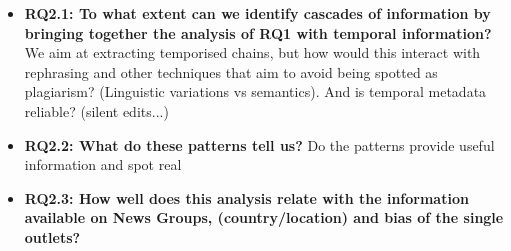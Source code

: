 \vspace{12px}

\begin{itemize}
    \item \textbf{RQ2.1: To what extent can we identify cascades of information by bringing together the analysis of RQ1 with temporal information?} We aim at extracting temporised chains, but how would this interact with rephrasing and other techniques that aim to avoid being spotted as plagiarism? (Linguistic variations vs semantics). And is temporal metadata reliable? (silent edits...)
    
    \item \textbf{RQ2.2: What do these patterns tell us?} Do the patterns provide useful information and spot real %
    
    \item \textbf{RQ2.3: How well does this analysis relate with the information available on News Groups, (country/location) and bias of the single outlets?}
    
\end{itemize}